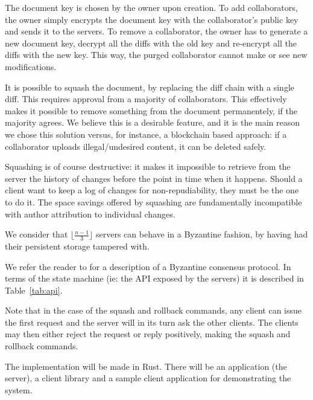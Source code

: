 The document key is chosen by the owner upon creation. To add collaborators, the owner
simply encrypts the document key with the collaborator's public
key and sends it to the servers. To remove a collaborator, the
owner has to generate a new document key, decrypt all the diffs
with the old key and re-encrypt all the diffs with the new key.
This way, the purged collaborator cannot make or see new
modifications.

It is possible to squash the document, by replacing the diff
chain with a single diff. This requires approval from a majority
of collaborators. This effectively makes it possible to remove
something from the document permanentely, if the majority agrees.
We believe this is a desirable feature, and it is the main reason
we chose this solution versus, for instance, a blockchain based
approach: if a collaborator uploads illegal/undesired content, it
can be deleted safely.

Squashing is of course destructive: it makes it impossible to retrieve
from the server the history of changes before the point in time when
it happens. Should a client want to keep a log of changes for non-repudiability,
they must be the one to do it. The space savings offered by squashing are
fundamentally incompatible with author attribution to individual changes.

We consider that $\lfloor \frac{n - 1}{3} \rfloor$ servers can
behave in a Byzantine fashion, by having had their persistent
storage tampered with.

We refer the reader to \cite{pbft} for a description of a Byzantine
consensus protocol. In terms of the state machine (ie: the API
exposed by the servers) it is described in Table~\ref{tab:api}.

Note that in the case of the squash and rollback commands, any
client can issue the first request and the server will in its
turn ask the other clients. The clients may then either reject
the request or reply positively, making the squash and rollback
commands.

The implementation will be made in Rust\cite{rust}. There will be an
application (the server), a client library and a sample client
application for demonstrating the system.
